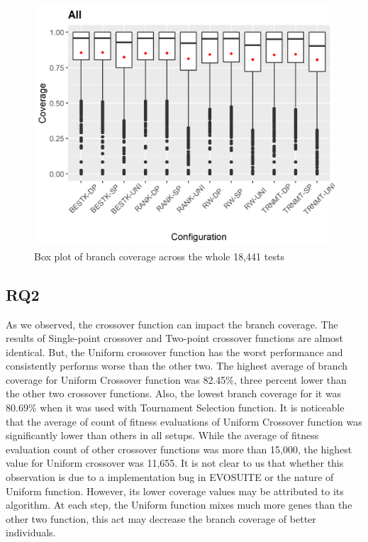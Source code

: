 \documentclass[sigconf]{acmart}
\begin{document}
\begin{figure}[b]
  \centering
  \includegraphics[width=\linewidth]{../output/all-boxplot.png}
  \caption{Box plot of branch coverage across the whole 18,441 tests}
  \label{fig:allboxplot}
\end{figure}

\subsection{RQ2}
As we observed, the crossover function can impact the branch coverage. The results of Single-point crossover 
and Two-point crossover functions are almost identical. But, the Uniform
crossover function has the worst performance and consistently performs worse than the other two. The highest
average of branch coverage for Uniform Crossover function was 82.45\%, three percent lower than the other two 
crossover functions. Also, the lowest branch coverage for it was 80.69\% when it was used with Tournament Selection
function. It is noticeable that the average of count of fitness evaluations of Uniform Crossover function was 
significantly lower than others in all setups. While the average of fitness evaluation count of other crossover 
functions was more than 15,000, the highest value for Uniform crossover was 11,655. It is not clear to us that 
whether this observation is due to a implementation bug in EVOSUITE or the nature of Uniform function. 
However, its lower coverage values may be attributed to its algorithm. At each step, the Uniform function mixes 
much more genes than the other two function, this act may decrease the branch coverage of better individuals.
\end{document}

